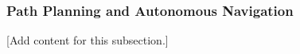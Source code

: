 
\subsubsection{Path Planning and Autonomous Navigation}
\label{subsubsec:design_2_5_3_path_planning_autonomous_navigation}

[Add content for this subsection.]
